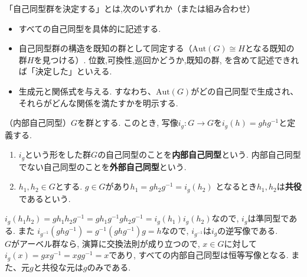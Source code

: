 「自己同型群を決定する」とは,次のいずれか（または組み合わせ）
\begin{itemize}
  \item すべての自己同型を具体的に記述する.
  \item 自己同型群の構造を既知の群として同定する（$\mathrm{Aut}(G)\cong H$となる既知の群$H$を見つける）.
    位数,可換性,巡回かどうか,既知の群, を含めて記述できれば「決定した」といえる.
  \item 生成元と関係式を与える. すなわち、$\mathrm{Aut}(G)$がどの自己同型で生成され、
    それらがどんな関係を満たすかを明示する.
\end{itemize}


\begin{dfn*}
	（内部自己同型）$G$を群とする. このとき, 
	写像$i_g:G\to G$を$i_g(h)=ghg^{-1}$と定義する.
	\begin{enumerate}
		\item $i_g$という形をした群$G$の自己同型のことを\textbf{内部自己同型}という.
			内部自己同型でない自己同型のことを\textbf{外部自己同型}という.
		\item $h_1,h_2 \in G$とする. 
		$g \in G$があり$h_1 = gh_2 g^{-1} = i_g(h_2)$
		となるとき$h_1,h_2$は\textbf{共役}であるという.
	\end{enumerate}	
\end{dfn*}

$i_g(h_1 h_2)=gh_1 h_2 g^{-1}=gh_1g^{-1}gh_2 g^{-1}=i_g(h_1)i_g(h_2)$なので,
$i_g$は準同型である. また
$i_{g^{-1}}(ghg^{-1})=g^{-1}(ghg^{-1})g=h$なので,
$i_{g^{-1}}$は$i_g$の逆写像である.\\

$G$がアーベル群なら, 演算に交換法則が成り立つので,
$x \in G$に対して$i_g(x)=gxg^{-1}=xgg^{-1}=x$であり,
すべての内部自己同型は恒等写像となる. また、元$g$と共役な元は$g$のみである.\newline

